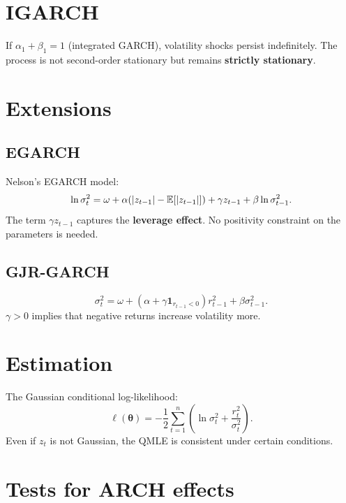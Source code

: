\section{IGARCH}

\begin{definition}
If $\alpha_1+\beta_1=1$ (integrated GARCH), volatility shocks persist indefinitely. The process is not second-order stationary but remains \textbf{strictly stationary}.
\end{definition}

\section{Extensions}

\subsection{EGARCH}
\begin{definition}
Nelson's EGARCH model:
\[
\ln\sigma_t^2 = \omega + \alpha(|z_{t-1}|-\mathbb{E}[|z_{t-1}|]) + \gamma z_{t-1} + \beta\ln\sigma_{t-1}^2.
\]
The term $\gamma z_{t-1}$ captures the \textbf{leverage effect}. No positivity constraint on the parameters is needed.
\end{definition}

\subsection{GJR-GARCH}
\begin{definition}
\[
\sigma_t^2 = \omega + (\alpha+\gamma\mathbf{1}_{r_{t-1}<0})r_{t-1}^2 + \beta\sigma_{t-1}^2.
\]
$\gamma>0$ implies that negative returns increase volatility more.
\end{definition}

\section{Estimation}

\begin{definition}
The Gaussian conditional log-likelihood:
\[
\ell(\bm\theta) = -\frac{1}{2}\sum_{t=1}^n\left(\ln\sigma_t^2 + \frac{r_t^2}{\sigma_t^2}\right).
\]
Even if $z_t$ is not Gaussian, the QMLE is consistent under certain conditions.
\end{definition}

\section{Tests for ARCH effects}

